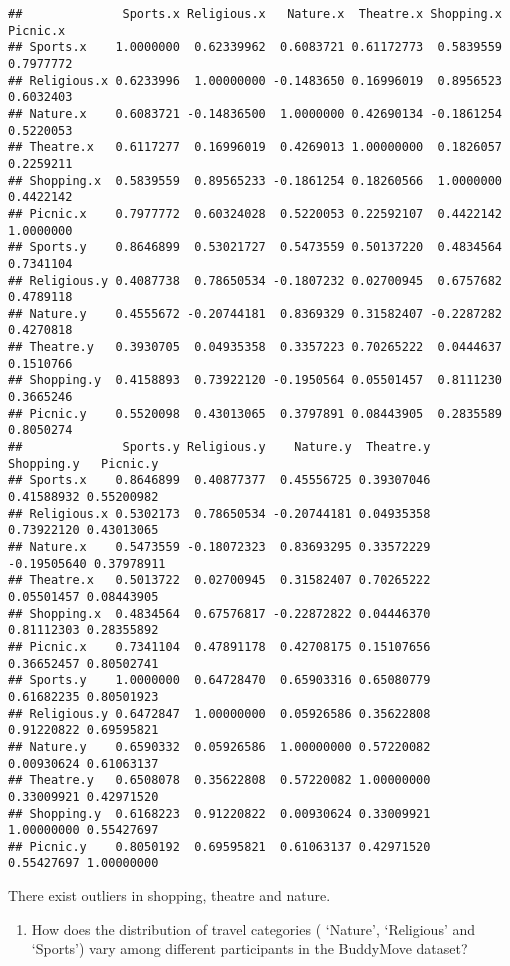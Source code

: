 \documentclass[
]{article}
\providecommand{\tightlist}{%
  \setlength{\itemsep}{0pt}\setlength{\parskip}{0pt}}
\begin{document}
\begin{verbatim}
##              Sports.x Religious.x   Nature.x  Theatre.x Shopping.x  Picnic.x
## Sports.x    1.0000000  0.62339962  0.6083721 0.61172773  0.5839559 0.7977772
## Religious.x 0.6233996  1.00000000 -0.1483650 0.16996019  0.8956523 0.6032403
## Nature.x    0.6083721 -0.14836500  1.0000000 0.42690134 -0.1861254 0.5220053
## Theatre.x   0.6117277  0.16996019  0.4269013 1.00000000  0.1826057 0.2259211
## Shopping.x  0.5839559  0.89565233 -0.1861254 0.18260566  1.0000000 0.4422142
## Picnic.x    0.7977772  0.60324028  0.5220053 0.22592107  0.4422142 1.0000000
## Sports.y    0.8646899  0.53021727  0.5473559 0.50137220  0.4834564 0.7341104
## Religious.y 0.4087738  0.78650534 -0.1807232 0.02700945  0.6757682 0.4789118
## Nature.y    0.4555672 -0.20744181  0.8369329 0.31582407 -0.2287282 0.4270818
## Theatre.y   0.3930705  0.04935358  0.3357223 0.70265222  0.0444637 0.1510766
## Shopping.y  0.4158893  0.73922120 -0.1950564 0.05501457  0.8111230 0.3665246
## Picnic.y    0.5520098  0.43013065  0.3797891 0.08443905  0.2835589 0.8050274
##              Sports.y Religious.y    Nature.y  Theatre.y  Shopping.y   Picnic.y
## Sports.x    0.8646899  0.40877377  0.45556725 0.39307046  0.41588932 0.55200982
## Religious.x 0.5302173  0.78650534 -0.20744181 0.04935358  0.73922120 0.43013065
## Nature.x    0.5473559 -0.18072323  0.83693295 0.33572229 -0.19505640 0.37978911
## Theatre.x   0.5013722  0.02700945  0.31582407 0.70265222  0.05501457 0.08443905
## Shopping.x  0.4834564  0.67576817 -0.22872822 0.04446370  0.81112303 0.28355892
## Picnic.x    0.7341104  0.47891178  0.42708175 0.15107656  0.36652457 0.80502741
## Sports.y    1.0000000  0.64728470  0.65903316 0.65080779  0.61682235 0.80501923
## Religious.y 0.6472847  1.00000000  0.05926586 0.35622808  0.91220822 0.69595821
## Nature.y    0.6590332  0.05926586  1.00000000 0.57220082  0.00930624 0.61063137
## Theatre.y   0.6508078  0.35622808  0.57220082 1.00000000  0.33009921 0.42971520
## Shopping.y  0.6168223  0.91220822  0.00930624 0.33009921  1.00000000 0.55427697
## Picnic.y    0.8050192  0.69595821  0.61063137 0.42971520  0.55427697 1.00000000
\end{verbatim}

There exist outliers in shopping, theatre and nature.

\begin{enumerate}
\def\labelenumi{\alph{enumi})}
\setcounter{enumi}{4}
\tightlist
\item
  How does the distribution of travel categories ( `Nature', `Religious'
  and `Sports') vary among different participants in the BuddyMove
  dataset?
\end{enumerate}
\end{document}
